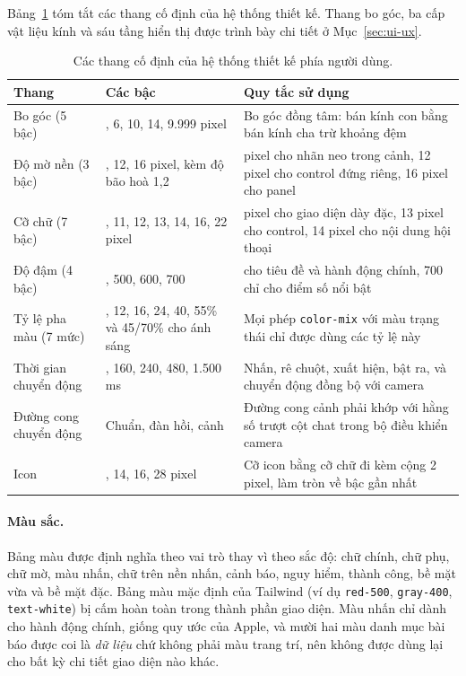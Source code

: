 Bảng~\ref{tab:thang-thiet-ke} tóm tắt các thang cố định của hệ thống thiết kế. Thang bo góc, ba cấp vật liệu kính và sáu tầng hiển thị được trình bày chi tiết ở Mục~\ref{sec:ui-ux}.

\begin{table}[htbp]
    \centering
    \caption{Các thang cố định của hệ thống thiết kế phía người dùng.}
    \label{tab:thang-thiet-ke}
    \small
    \begin{tabularx}{\textwidth}{@{}>{\raggedright\arraybackslash}p{2.6cm}>{\raggedright\arraybackslash}p{5.4cm}>{\raggedright\arraybackslash}X@{}}
        \toprule
        \textbf{Thang} & \textbf{Các bậc} & \textbf{Quy tắc sử dụng} \\
        \midrule
        Bo góc (5 bậc) & 4, 6, 10, 14, 9.999 pixel & Bo góc đồng tâm: bán kính con bằng bán kính cha trừ khoảng đệm \\
        Độ mờ nền (3 bậc) & 6, 12, 16 pixel, kèm độ bão hoà 1,2 & 6 pixel cho nhãn neo trong cảnh, 12 pixel cho control đứng riêng, 16 pixel cho panel \\
        Cỡ chữ (7 bậc) & 10, 11, 12, 13, 14, 16, 22 pixel & 12 pixel cho giao diện dày đặc, 13 pixel cho control, 14 pixel cho nội dung hội thoại \\
        Độ đậm (4 bậc) & 400, 500, 600, 700 & 600 cho tiêu đề và hành động chính, 700 chỉ cho điểm số nổi bật \\
        Tỷ lệ pha màu (7 mức) & 6, 12, 16, 24, 40, 55\% và 45/70\% cho ánh sáng & Mọi phép \texttt{color-mix} với màu trạng thái chỉ được dùng các tỷ lệ này \\
        Thời gian chuyển động & 120, 160, 240, 480, 1.500 ms & Nhấn, rê chuột, xuất hiện, bật ra, và chuyển động đồng bộ với camera \\
        Đường cong chuyển động & Chuẩn, đàn hồi, cảnh & Đường cong cảnh phải khớp với hằng số trượt cột chat trong bộ điều khiển camera \\
        Icon & 12, 14, 16, 28 pixel & Cỡ icon bằng cỡ chữ đi kèm cộng 2 pixel, làm tròn về bậc gần nhất \\
        \bottomrule
    \end{tabularx}
\end{table}

\paragraph{Màu sắc.} Bảng màu được định nghĩa theo vai trò thay vì theo sắc độ: chữ chính, chữ phụ, chữ mờ, màu nhấn, chữ trên nền nhấn, cảnh báo, nguy hiểm, thành công, bề mặt vừa và bề mặt đặc. Bảng màu mặc định của Tailwind (ví dụ \texttt{red-500}, \texttt{gray-400}, \texttt{text-white}) bị cấm hoàn toàn trong thành phần giao diện. Màu nhấn chỉ dành cho hành động chính, giống quy ước của Apple, và mười hai màu danh mục bài báo được coi là \emph{dữ liệu} chứ không phải màu trang trí, nên không được dùng lại cho bất kỳ chi tiết giao diện nào khác.


